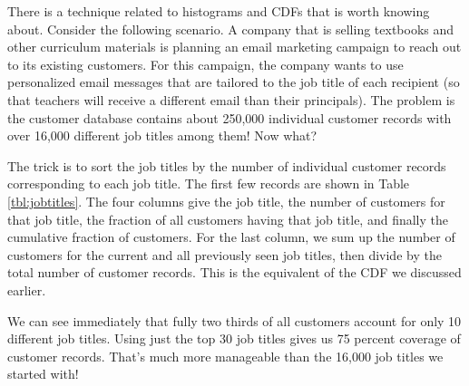 
There is a technique related to histograms and CDFs that is worth
knowing about. Consider the following scenario. A company that is
selling textbooks and other curriculum materials is planning an email
marketing campaign to reach out to its existing customers.  For this
campaign, the company wants to use personalized email messages that
are tailored to the job title of each recipient (so that teachers will
receive a different email than their principals).  The problem is the
customer database contains about 250,000 individual customer records
with over 16,000 different job titles among them! Now what?

The trick is to sort the job titles by the number of individual
customer records corresponding to each job title. The first few
records are shown in Table \ref{tbl:jobtitles}. The four columns give
the job title, the number of customers for that job title, the
fraction of all customers having that job title, and finally the
cumulative fraction of customers. For the last column, we sum up the
number of customers for the current and all previously seen job
titles, then divide by the total number of customer records. This is
the equivalent of the CDF we discussed earlier.

We can see immediately that fully two thirds of all customers account
for only 10 different job titles. Using just the top 30 job titles
gives us 75 percent coverage of customer records. That's much more
manageable than the 16,000 job titles we started with!

